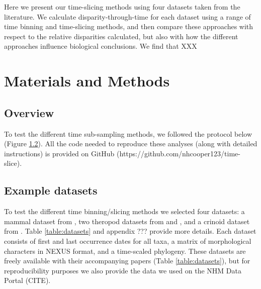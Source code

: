 \documentclass[12pt,a4paper]{article}
\begin{document}
Here we present our time-slicing methods using four datasets taken from the literature.
We calculate disparity-through-time for each dataset using a range of time binning and time-slicing methods, and then compare these approaches with respect to the relative disparities calculated, but also with how the different approaches influence biological conclusions. We find that XXX

\section{Materials and Methods}
\subsection{Overview}
\label{overview-section}
To test the different time sub-sampling methods, we followed the protocol below (Figure \ref{datasets}). 
All the code needed to reproduce these analyses (along with detailed instructions) is provided on GitHub (https://github.com/nhcooper123/time-slice). 



\subsection{Example datasets}
\label{datasets}
To test the different time binning/slicing methods we selected four datasets: a mammal dataset from \cite{beckancient2014}, two theropod datasets from \cite{brusatte2014gradual} and \cite{bapst2016topology}, and a crinoid dataset from \cite{wright2017bayesian}.
Table \ref{table:datasets} and appendix ??? provide more details. %
Each dataset consists of first and last occurrence dates for all taxa, a matrix of morphological characters in NEXUS format, and a time-scaled phylogeny. 
These datasets are freely available with their accompanying papers (Table \ref{table:datasets}), but for reproducibility purposes we also provide the data we used on the NHM Data Portal (CITE).

\begin{landscape}
   
  \label{table:datasets}  
\end{landscape}
\end{document}
